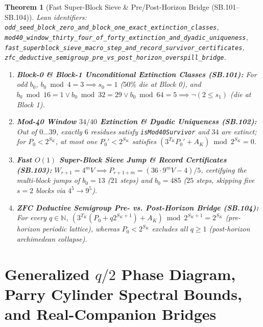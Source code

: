 \documentclass[11pt]{article}
\newtheorem{theorem}{Theorem}[section]
\begin{document}
\begin{theorem}[Fast Super-Block Sieve \& Pre/Post-Horizon Bridge (SB.101--SB.104)]
\emph{Lean identifiers:} \nolinkurl{odd_seed_block_zero_and_block_one_exact_extinction_classes}, \nolinkurl{mod40_window_thirty_four_of_forty_extinction_and_dyadic_uniqueness}, \nolinkurl{fast_superblock_sieve_macro_step_and_record_survivor_certificates}, \nolinkurl{zfc_deductive_semigroup_pre_vs_post_horizon_overspill_bridge}.
\begin{enumerate}
  \item \textbf{Block-0 \& Block-1 Unconditional Extinction Classes (SB.101):} For odd $b_0$, $b_0 \bmod 4 = 3 \implies s_0 = 1$ ($50\%$ die at Block 0), and $b_0 \bmod 16 = 1 \vee b_0 \bmod 32 = 29 \vee b_0 \bmod 64 = 5 \implies \neg(2 \le s_1)$ (die at Block 1).
  \item \textbf{Mod-40 Window $34/40$ Extinction \& Dyadic Uniqueness (SB.102):} Out of $0\dots 39$, exactly $6$ residues satisfy \texttt{isMod40Survivor} and $34$ are extinct; for $P_0 < 2^{S_K}$, at most one $P_0' < 2^{S_K}$ satisfies $(3^{T_K} P_0' + A_K) \bmod 2^{S_K} = 0$.
  \item \textbf{Fast $O(1)$ Super-Block Sieve Jump \& Record Certificates (SB.103):} $W_{r+1} = 4^m V \implies P_{r+1+m} = (36 \cdot 9^m V - 4)/5$, certifying the multi-block jumps of $b_0 = 13$ ($21$ steps) and $b_0 = 485$ ($25$ steps, skipping five $s=2$ blocks via $4^5 \to 9^5$).
  \item \textbf{ZFC Deductive Semigroup Pre- vs. Post-Horizon Bridge (SB.104):} For every $q \in \mathbb{N}$, $(3^{T_K}(P_0 + q 2^{S_K+1}) + A_K) \bmod 2^{S_K+1} = 2^{S_K}$ (pre-horizon periodic lattice), whereas $P_0 < 2^{S_K}$ excludes all $q \ge 1$ (post-horizon archimedean collapse).
\end{enumerate}
\end{theorem}

\section{Generalized $q/2$ Phase Diagram, Parry Cylinder Spectral Bounds, and Real-Companion Bridges}
\end{document}
